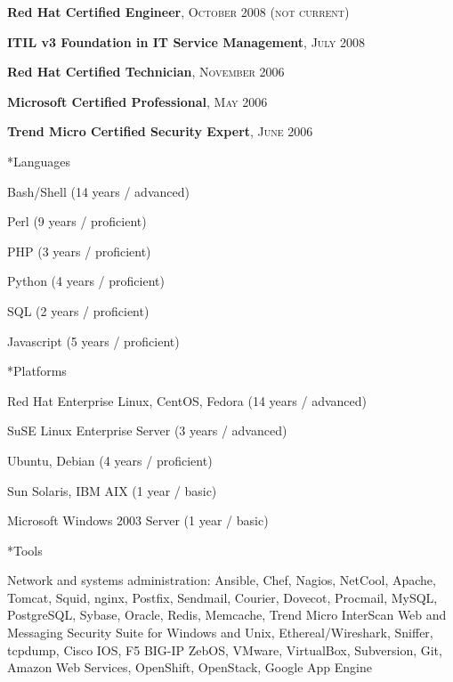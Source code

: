 \documentclass[10pt, a4paper, final]{article}
\begin{document}
\begin{section}
\begin{subsection}
\begin{compactitem}
      \item \textbf{Red Hat Certified Engineer}, \textsc{October 2008 (not current)}
      \item \textbf{ITIL v3 Foundation in IT Service Management}, \textsc{July 2008}
      \item \textbf{Red Hat Certified Technician}, \textsc{November 2006}
      \item \textbf{Microsoft Certified Professional}, \textsc{May 2006}
      \item \textbf{Trend Micro Certified Security Expert}, \textsc{June 2006}
    \end{compactitem}
  \end{subsection}
  \vspace{1em}
  \begin{subsection}*{Languages}
    \begin{compactitem}
      \item Bash/Shell (14 years / advanced) 
      \item Perl (9 years / proficient) 
      \item PHP (3 years / proficient) 
      \item Python (4 years / proficient) 
      \item SQL (2 years / proficient) 
      \item Javascript (5 years / proficient) 
    \end{compactitem}
  \end{subsection}
  \vspace{1em}
  \begin{subsection}*{Platforms}
    \begin{compactitem}
      \item Red Hat Enterprise Linux, CentOS, Fedora (14 years / advanced) 
      \item SuSE Linux Enterprise Server (3 years / advanced) 
      \item Ubuntu, Debian (4 years / proficient) 
      \item Sun Solaris, IBM AIX (1 year / basic) 
      \item Microsoft Windows 2003 Server (1 year / basic) 
    \end{compactitem}
  \end{subsection}
  \vspace{1em}
  \begin{subsection}*{Tools}
    \begin{compactitem}
      \item Network and systems administration: Ansible, Chef, Nagios, NetCool, Apache, Tomcat, Squid, nginx, Postfix, Sendmail, Courier, Dovecot, Procmail, MySQL, PostgreSQL, Sybase, Oracle, Redis, Memcache, Trend Micro InterScan Web and Messaging Security Suite for Windows and Unix, Ethereal/Wireshark, Sniffer, tcpdump, Cisco IOS, F5 BIG-IP ZebOS, VMware, VirtualBox, Subversion, Git, Amazon Web Services, OpenShift, OpenStack, Google App Engine

\end{compactitem}
\end{subsection}
\end{section}
\end{document}
